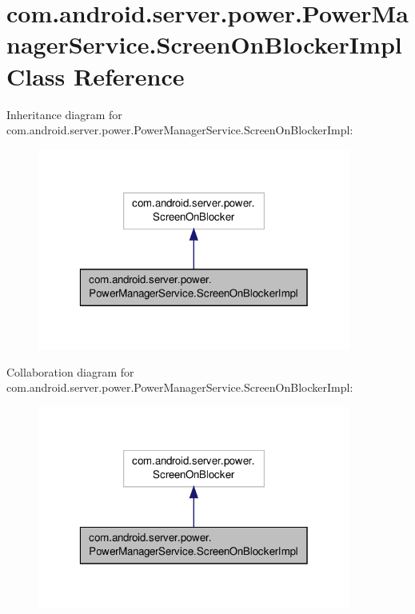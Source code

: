 \hypertarget{classcom_1_1android_1_1server_1_1power_1_1PowerManagerService_1_1ScreenOnBlockerImpl}{\section{com.\-android.\-server.\-power.\-Power\-Manager\-Service.\-Screen\-On\-Blocker\-Impl Class Reference}
\label{classcom_1_1android_1_1server_1_1power_1_1PowerManagerService_1_1ScreenOnBlockerImpl}
}


Inheritance diagram for com.\-android.\-server.\-power.\-Power\-Manager\-Service.\-Screen\-On\-Blocker\-Impl\-:
\nopagebreak
\begin{figure}[H]
\begin{center}
\leavevmode
\includegraphics[width=292pt]{classcom_1_1android_1_1server_1_1power_1_1PowerManagerService_1_1ScreenOnBlockerImpl__inherit__graph}
\end{center}
\end{figure}


Collaboration diagram for com.\-android.\-server.\-power.\-Power\-Manager\-Service.\-Screen\-On\-Blocker\-Impl\-:
\nopagebreak
\begin{figure}[H]
\begin{center}
\leavevmode
\includegraphics[width=292pt]{classcom_1_1android_1_1server_1_1power_1_1PowerManagerService_1_1ScreenOnBlockerImpl__coll__graph}
\end{center}
\end{figure}
